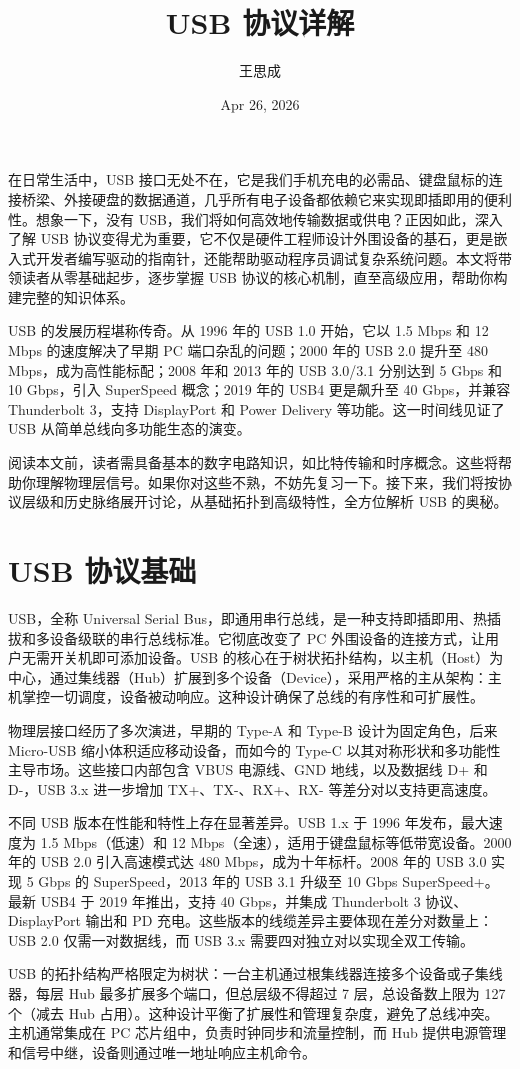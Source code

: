 \title{USB 协议详解}
\author{王思成}
\date{Apr 26, 2026}
\maketitle
在日常生活中，USB 接口无处不在，它是我们手机充电的必需品、键盘鼠标的连接桥梁、外接硬盘的数据通道，几乎所有电子设备都依赖它来实现即插即用的便利性。想象一下，没有 USB，我们将如何高效地传输数据或供电？正因如此，深入了解 USB 协议变得尤为重要，它不仅是硬件工程师设计外围设备的基石，更是嵌入式开发者编写驱动的指南针，还能帮助驱动程序员调试复杂系统问题。本文将带领读者从零基础起步，逐步掌握 USB 协议的核心机制，直至高级应用，帮助你构建完整的知识体系。\par
USB 的发展历程堪称传奇。从 1996 年的 USB 1.0 开始，它以 1.5 Mbps 和 12 Mbps 的速度解决了早期 PC 端口杂乱的问题；2000 年的 USB 2.0 提升至 480 Mbps，成为高性能标配；2008 年和 2013 年的 USB 3.0/3.1 分别达到 5 Gbps 和 10 Gbps，引入 SuperSpeed 概念；2019 年的 USB4 更是飙升至 40 Gbps，并兼容 Thunderbolt 3，支持 DisplayPort 和 Power Delivery 等功能。这一时间线见证了 USB 从简单总线向多功能生态的演变。\par
阅读本文前，读者需具备基本的数字电路知识，如比特传输和时序概念。这些将帮助你理解物理层信号。如果你对这些不熟，不妨先复习一下。接下来，我们将按协议层级和历史脉络展开讨论，从基础拓扑到高级特性，全方位解析 USB 的奥秘。\par
\chapter{USB 协议基础}
USB，全称 Universal Serial Bus，即通用串行总线，是一种支持即插即用、热插拔和多设备级联的串行总线标准。它彻底改变了 PC 外围设备的连接方式，让用户无需开关机即可添加设备。USB 的核心在于树状拓扑结构，以主机（Host）为中心，通过集线器（Hub）扩展到多个设备（Device），采用严格的主从架构：主机掌控一切调度，设备被动响应。这种设计确保了总线的有序性和可扩展性。\par
物理层接口经历了多次演进，早期的 Type-A 和 Type-B 设计为固定角色，后来 Micro-USB 缩小体积适应移动设备，而如今的 Type-C 以其对称形状和多功能性主导市场。这些接口内部包含 VBUS 电源线、GND 地线，以及数据线 D+ 和 D-，USB 3.x 进一步增加 TX+、TX-、RX+、RX- 等差分对以支持更高速度。\par
不同 USB 版本在性能和特性上存在显著差异。USB 1.x 于 1996 年发布，最大速度为 1.5 Mbps（低速）和 12 Mbps（全速），适用于键盘鼠标等低带宽设备。2000 年的 USB 2.0 引入高速模式达 480 Mbps，成为十年标杆。2008 年的 USB 3.0 实现 5 Gbps 的 SuperSpeed，2013 年的 USB 3.1 升级至 10 Gbps SuperSpeed+。最新 USB4 于 2019 年推出，支持 40 Gbps，并集成 Thunderbolt 3 协议、DisplayPort 输出和 PD 充电。这些版本的线缆差异主要体现在差分对数量上：USB 2.0 仅需一对数据线，而 USB 3.x 需要四对独立对以实现全双工传输。\par
USB 的拓扑结构严格限定为树状：一台主机通过根集线器连接多个设备或子集线器，每层 Hub 最多扩展多个端口，但总层级不得超过 7 层，总设备数上限为 127 个（减去 Hub 占用）。这种设计平衡了扩展性和管理复杂度，避免了总线冲突。主机通常集成在 PC 芯片组中，负责时钟同步和流量控制，而 Hub 提供电源管理和信号中继，设备则通过唯一地址响应主机命令。\par
